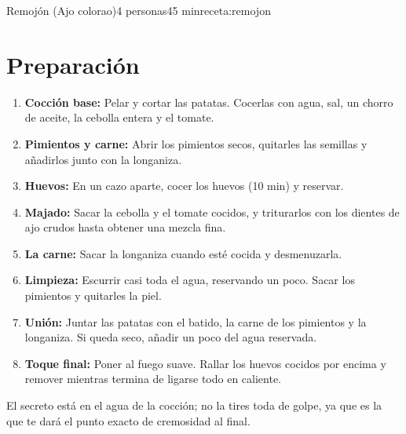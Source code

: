 \begin{recetaConImagen}{Remojón (Ajo colorao)}{4 personas}{45 min}{receta:remojon}
\begin{minipage}[t]{0.6\textwidth}
        \section*{Preparación}
        \begin{enumerate}[itemsep=2pt, topsep=2pt]
            \item \textbf{Cocción base:} Pelar y cortar las patatas. Cocerlas con agua, sal, un chorro de aceite, la cebolla entera y el tomate.
            \item \textbf{Pimientos y carne:} Abrir los pimientos secos, quitarles las semillas y añadirlos junto con la longaniza.
            \item \textbf{Huevos:} En un cazo aparte, cocer los huevos (10 min) y reservar.
            \item \textbf{Majado:} Sacar la cebolla y el tomate cocidos, y triturarlos con los dientes de ajo crudos hasta obtener una mezcla fina.
            \item \textbf{La carne:} Sacar la longaniza cuando esté cocida y desmenuzarla.
            \item \textbf{Limpieza:} Escurrir casi toda el agua, reservando un poco. Sacar los pimientos y quitarles la piel.
            \item \textbf{Unión:} Juntar las patatas con el batido, la carne de los pimientos y la longaniza. Si queda seco, añadir un poco del agua reservada.
            \item \textbf{Toque final:} Poner al fuego suave. Rallar los huevos cocidos por encima y remover mientras termina de ligarse todo en caliente.
        \end{enumerate}
    \end{minipage}

    \vspace{0.5em}
    \begin{tcolorbox}[colback=orange!5, colframe=orange!50, title=Nota del Chef, size=small]
        El secreto está en el agua de la cocción; no la tires toda de golpe, ya que es la que te dará el punto exacto de cremosidad al final.
    \end{tcolorbox}
\end{recetaConImagen}
